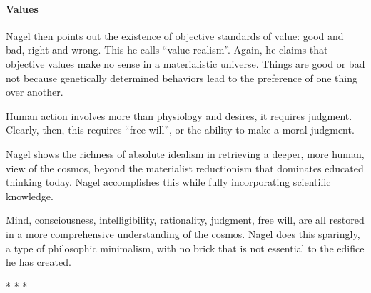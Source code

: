 \paragraph{Values}
Nagel then points out the existence of objective standards of value: good and bad, right and wrong. This he calls “value
realism”. Again, he claims that objective values make no sense in a materialistic universe. Things are good or bad not
because genetically determined behaviors lead to the preference of one thing over another.

Human action involves more than physiology and desires, it requires judgment. Clearly, then, this requires “free will”,
or the ability to make a moral judgment.

Nagel shows the richness of absolute idealism in retrieving a deeper, more human, view of the cosmos, beyond the
materialist reductionism that dominates educated thinking today. Nagel accomplishes this while fully incorporating
scientific knowledge.

Mind, consciousness, intelligibility, rationality, judgment, free will, are all restored in a more comprehensive
understanding of the cosmos. Nagel does this sparingly, a type of philosophic minimalism, with no brick that is not
essential to the edifice he has created.


\begin{center}* * *\end{center}

